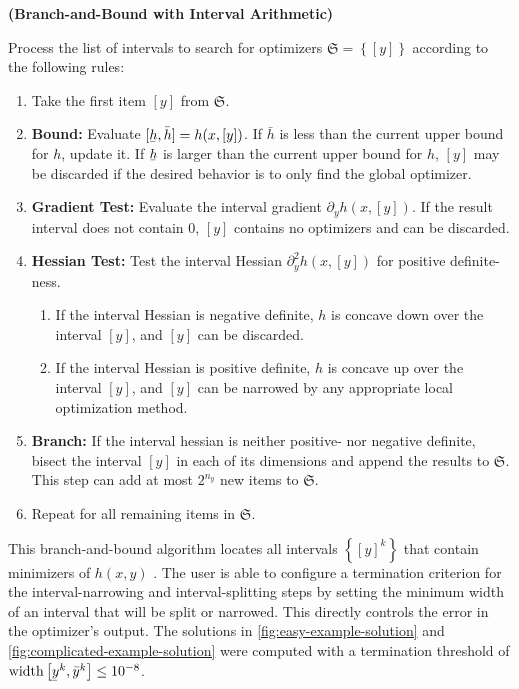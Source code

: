 \documentclass[twoside,leqno, twocolumn]{article}
\newcommand{\frS}{\ensuremath{\mathfrak{S}}}
\newcommand\ubar[1]{\underaccent{\bar}{#1}}
\begin{document}
\begin{algorithm}
	\label{algo:bnb-ia}
	\textbf{(Branch-and-Bound with Interval Arithmetic)}
	
	Process the list of intervals to search for optimizers $\frS = \left\{[y]\right\}$ according to the following rules:
	\begin{enumerate} 
		\item Take the first item $[y]$ from $\frS$.
		\item \textbf{Bound:} Evaluate $[\ubar h, \bar h] = h(x, [y])$. If $\bar h$ is less than the current upper bound for $h$, update it. If $\ubar h$ is larger than the current upper bound for $h$, $[y]$ may be discarded if the desired behavior is to only find the global optimizer.
		\item \textbf{Gradient Test:} Evaluate the interval gradient $\partial_y h(x, [y])$. If the result interval does not contain $0$, $[y]$ contains no optimizers and can be discarded.
		\item \textbf{Hessian Test:} Test the interval Hessian $\partial^2_y h(x, [y])$ for positive definite-ness.
		\begin{enumerate}
			\item If the interval Hessian is negative definite, $h$ is concave down over the interval $[y]$, and $[y]$ can be discarded.
			\item If the interval Hessian is positive definite, $h$ is concave up over the interval $[y]$, and $[y]$ can be narrowed by any appropriate local optimization method.
		\end{enumerate}
		\item \textbf{Branch:} If the interval hessian is neither positive- nor negative definite, bisect the interval $[y]$ in each of its dimensions and append the results to $\frS$. This step can add at most $2^{n_y}$ new items to $\frS$.
		\item Repeat for all remaining items in $\frS$.
	\end{enumerate}
\end{algorithm}
This branch-and-bound algorithm locates all intervals $\left\{[y]^k\right\}$ that contain minimizers of $h(x, y)$ \cite{rallGlobalOptimizationUsing1985, deussenGlobalSearchLocal2020}. The user is able to configure a termination criterion for the interval-narrowing and interval-splitting steps by setting the minimum width of an interval that will be split or narrowed. This directly controls the error in the optimizer's output. The solutions in \ref{fig:easy-example-solution} and \ref{fig:complicated-example-solution} were computed with a termination threshold of $\mathrm{width}\left[\ubar y^k, \bar y^k\right] \leq 10^{-8}$.
\end{document}
